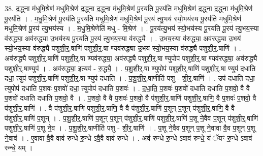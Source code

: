 \documentclass[17pt]{extarticle}
\begin{document}
38. द॒द्ध्ना म॑धुमि॒श्रेण॑ मधुमि॒श्रेण॑ द॒द्ध्ना द॒द्ध्ना म॑धुमि॒श्रेण॑ पू॒रय॑ति पू॒रय॑ति मधुमि॒श्रेण॑ द॒द्ध्ना द॒द्ध्ना म॑धुमि॒श्रेण॑ पू॒रय॑ति । . म॒धु॒मि॒श्रेण॑ पू॒रय॑ति पू॒रय॑ति मधुमि॒श्रेण॑ मधुमि॒श्रेण॑ पू॒रय॑ त्यु॒भय॑ स्यो॒भय॑स्य पू॒रय॑ति मधुमि॒श्रेण॑ मधुमि॒श्रेण॑ पू॒रय॑ त्यु॒भय॑स्य । . म॒धु॒मि॒श्रेणेति॑ मधु - मि॒श्रेण॑ । . पू॒रय॑त्यु॒भय॑ स्यो॒भय॑स्य पू॒रय॑ति पू॒रय॑ त्यु॒भय॒स्या व॑रुद्ध्या॒ अव॑रुद्ध्या उ॒भय॑स्य पू॒रय॑ति पू॒रय॑ त्यु॒भय॒स्या व॑रुद्ध्यै । . उ॒भय॒स्या व॑रुद्ध्या॒ अव॑रुद्ध्या उ॒भय॑ स्यो॒भय॒स्या व॑रुद्ध्यै पशुशी॒र्॒.षाणि॑ पशुशी॒र्॒.षा ण्यव॑रुद्ध्या उ॒भय॑ स्यो॒भय॒स्या व॑रुद्ध्यै पशुशी॒र्॒.षाणि॑ । . अव॑रुद्ध्यै पशुशी॒र्॒.षाणि॑ पशुशी॒र्॒.षा ण्यव॑रुद्ध्या॒ अव॑रुद्ध्यै पशुशी॒र्॒.षा ण्युपोप॑ पशुशी॒र्॒.षा ण्यव॑रुद्ध्या॒ अव॑रुद्ध्यै पशुशी॒र्॒.षाण्युप॑ । . अव॑रुद्ध्या॒ इत्यव॑ - रु॒द्ध्यै॒ । . प॒शु॒शी॒र्॒.षा ण्युपोप॑ पशुशी॒र्॒.षाणि॑ पशुशी॒र्॒.षा ण्युप॑ दधाति दधा॒ त्युप॑ पशुशी॒र्॒.षाणि॑ पशुशी॒र्॒.षा ण्युप॑ दधाति । . प॒शु॒शी॒र्॒.षाणीति॑ पशु - शी॒र्॒.षाणि॑ । . उप॑ दधाति दधा॒ त्युपोप॑ दधाति प॒शवः॑ प॒शवो॑ दधा॒ त्युपोप॑ दधाति प॒शवः॑ । . द॒धा॒ति॒ प॒शवः॑ प॒शवो॑ दधाति दधाति प॒शवो॒ वै वै प॒शवो॑ दधाति दधाति प॒शवो॒ वै । . प॒शवो॒ वै वै प॒शवः॑ प॒शवो॒ वै प॑शुशी॒र्॒.षाणि॑ पशुशी॒र्॒.षाणि॒ वै प॒शवः॑ प॒शवो॒ वै प॑शुशी॒र्॒.षाणि॑ । . वै प॑शुशी॒र्॒.षाणि॑ पशुशी॒र्॒.षाणि॒ वै वै प॑शुशी॒र्॒.षाणि॑ प॒शून् प॒शून् प॑शुशी॒र्॒.षाणि॒ वै वै प॑शुशी॒र्॒.षाणि॑ प॒शून् । . प॒शु॒शी॒र्॒.षाणि॑ प॒शून् प॒शून् प॑शुशी॒र्॒.षाणि॑ पशुशी॒र्॒.षाणि॑ प॒शू ने॒वैव प॒शून् प॑शुशी॒र्॒.षाणि॑ पशुशी॒र्॒.षाणि॑ प॒शू ने॒व । . प॒शु॒शी॒र्॒.षाणीति॑ पशु - शी॒र्॒.षाणि॑ । . प॒शू ने॒वैव प॒शून् प॒शू ने॒वावा वै॒व प॒शून् प॒शू ने॒वाव॑ । . ए॒वावा वै॒वै वाव॑ रुन्धे रु॒न्धे ऽवै॒वै वाव॑ रुन्धे । . अव॑ रुन्धे रु॒न्धे ऽवाव॑ रुन्धे॒ यं ॅयꣳ रु॒न्धे ऽवाव॑ रुन्धे॒ यम् । \newline
\end{document}
